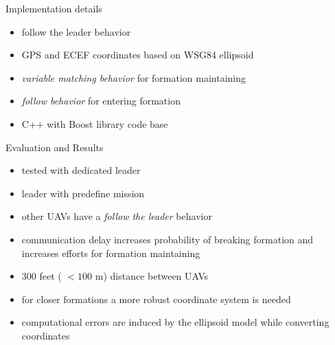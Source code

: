 \documentclass{beamer}
\begin{document}
\begin{frame}{Implementation details}
\begin{itemize}
\item follow the leader behavior
\item GPS and ECEF coordinates based on WSG84 ellipsoid
\item \textit{variable matching behavior} for formation maintaining
\item \textit{follow behavior} for entering formation
\item C++ with Boost library code base
\end{itemize}
\end{frame}

\begin{frame}{Evaluation and Results}
\begin{itemize}
\item tested with dedicated leader
\item leader with predefine mission
\item other UAVs have a \textit{follow the leader} behavior
\item communication delay increases probability of breaking formation and increases efforts for formation maintaining
\item 300 feet ( $<100$ m) distance between UAVs
\item for closer formations a more robust coordinate system is needed
\item computational errors are induced by the ellipsoid model while converting coordinates
\end{itemize}
\end{frame}
\end{document}
